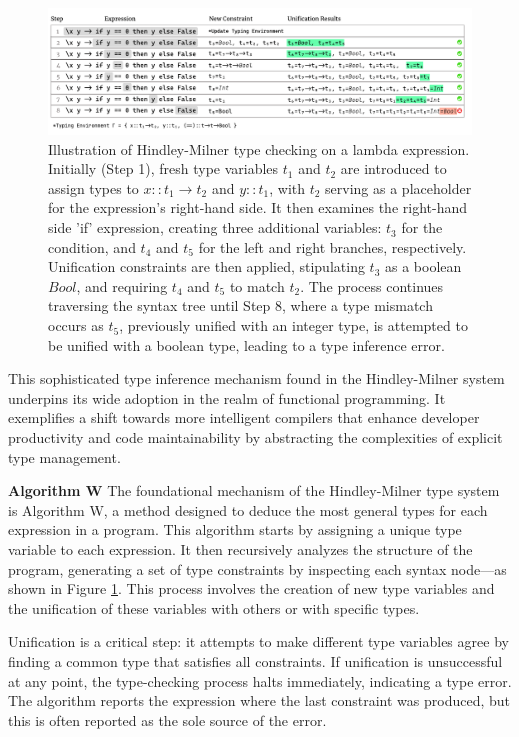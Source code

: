 \begin{figure}[hbt]
    \includegraphics[width=\linewidth]{HindleyMilner}
    \caption{
      \label{fig:hindley-milner}
      Illustration of Hindley-Milner type checking on a lambda expression. Initially (Step 1), fresh type variables $t_1$  and $ t_2 $ are introduced to assign types to $x :: t_1 \to t_2$ and $y :: t_1$, with $ t_2$ serving as a placeholder for the expression’s right-hand side. It then examines the right-hand side 'if' expression, creating three additional variables: $t_3$ for the condition, and $t_4$ and $t_5$ for the left and right branches, respectively. Unification constraints are then applied, stipulating $t_3$ as a boolean $Bool$, and requiring $t_4$ and $t_5$ to match $t_2$. The process continues traversing the syntax tree until Step 8, where a type mismatch occurs as $t_5$, previously unified with an integer type, is attempted to be unified with a boolean type, leading to a type inference error.
       }
\end{figure}

This sophisticated type inference mechanism found in the Hindley-Milner system underpins its wide adoption in the realm of functional programming. It exemplifies a shift towards more intelligent compilers that enhance developer productivity and code maintainability by abstracting the complexities of explicit type management.

\textbf{Algorithm W}  The foundational mechanism of the Hindley-Milner type system is Algorithm W, a method designed to deduce the most general types for each expression in a program. This algorithm starts by assigning a unique type variable to each expression. It then recursively analyzes the structure of the program, generating a set of type constraints by inspecting each syntax node—as shown in Figure \ref{fig:hindley-milner}. This process involves the creation of new type variables and the unification of these variables with others or with specific types.

Unification is a critical step: it attempts to make different type variables agree by finding a common type that satisfies all constraints. If unification is unsuccessful at any point, the type-checking process halts immediately, indicating a type error. The algorithm reports the expression where the last constraint was produced, but this is often reported as the sole source of the error.


